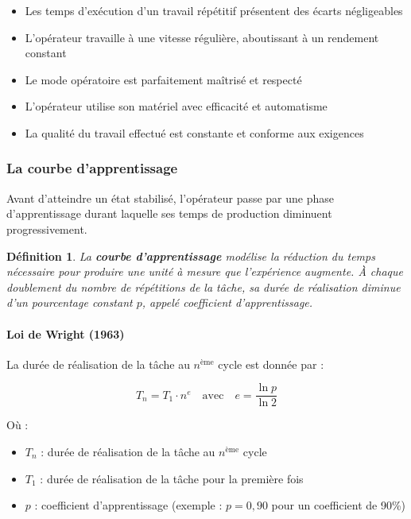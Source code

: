 \documentclass[a4paper,12pt]{article}
\newtheorem{definition}{Définition}[section]
\begin{document}
\begin{itemize}
    \item Les temps d'exécution d'un travail répétitif présentent des écarts négligeables
    \item L'opérateur travaille à une vitesse régulière, aboutissant à un rendement constant
    \item Le mode opératoire est parfaitement maîtrisé et respecté
    \item L'opérateur utilise son matériel avec efficacité et automatisme
    \item La qualité du travail effectué est constante et conforme aux exigences
\end{itemize}

\subsubsection{La courbe d'apprentissage}

Avant d'atteindre un état stabilisé, l'opérateur passe par une phase d'apprentissage durant laquelle ses temps de production diminuent progressivement.

\begin{definition}
La \textbf{courbe d'apprentissage} modélise la réduction du temps nécessaire pour produire une unité à mesure que l'expérience augmente. À chaque doublement du nombre de répétitions de la tâche, sa durée de réalisation diminue d'un pourcentage constant $p$, appelé coefficient d'apprentissage.
\end{definition}

\paragraph{Loi de Wright (1963)}

La durée de réalisation de la tâche au $n^{\text{ème}}$ cycle est donnée par :

\[
T_{n} = T_1 \cdot n^{e} \quad \text{avec} \quad e = \frac{\ln p}{\ln 2}
\]

Où :
\begin{itemize}
    \item $T_{n}$ : durée de réalisation de la tâche au $n^{\text{ème}}$ cycle
    \item $T_1$ : durée de réalisation de la tâche pour la première fois
    \item $p$ : coefficient d'apprentissage (exemple : $p = 0,90$ pour un coefficient de 90\%)
\end{itemize}
\end{document}
